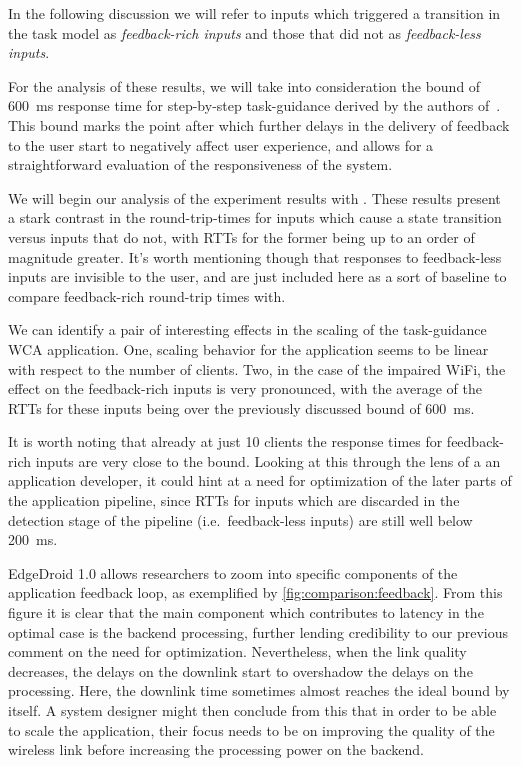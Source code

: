 In the following discussion we will refer to inputs which triggered a transition in the task model as \emph{feedback-rich inputs} and those that did not as \emph{feedback-less inputs}.

For the analysis of these results, we will take into consideration the bound of \SI{600}{\milli\second} response time for step-by-step task-guidance derived by the authors of~\cite{Chen:AnEmpiricalStudyOfLatency}.
This bound marks the point after which further delays in the delivery of feedback to the user start to negatively affect user experience, and allows for a straightforward evaluation of the responsiveness of the system.

We will begin our analysis of the experiment results with .
These results present a stark contrast in the round-trip-times for inputs which cause a state transition versus inputs that do not, with RTTs for the former being up to an order of magnitude greater.
It's worth mentioning though that responses to feedback-less inputs are invisible to the user, and are just included here as a sort of baseline to compare feedback-rich round-trip times with.

We can identify a pair of interesting effects in the scaling of the task-guidance WCA application.
One, scaling behavior for the application seems to be linear with respect to the number of clients.
Two, in the case of the impaired WiFi, the effect on the feedback-rich inputs is very pronounced, with the average of the RTTs for these inputs being over the previously discussed bound of \SI{600}{\milli\second}.

It is worth noting that already at just 10 clients the response times for feedback-rich inputs are very close to the bound.
Looking at this through the lens of a an application developer, it could hint at a need for optimization of the later parts of the application pipeline, since RTTs for inputs which are discarded in the detection stage of the pipeline (i.e.\ feedback-less inputs) are still well below \SI{200}{\milli\second}.

EdgeDroid 1.0 allows researchers to zoom into specific components of the application feedback loop, as exemplified by \cref{fig:comparison:feedback}.
From this figure it is clear that the main component which contributes to latency in the optimal case is the backend processing, further lending credibility to our previous comment on the need for optimization.
Nevertheless, when the link quality decreases, the delays on the downlink start to overshadow the delays on the processing.
Here, the downlink time sometimes almost reaches the ideal bound by itself.
A system designer might then conclude from this that in order to be able to scale the application, their focus needs to be on improving the quality of the wireless link before increasing the processing power on the backend.

